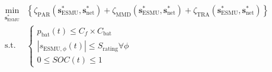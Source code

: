 \begin{equation}
\begin{split}
	\min_{\textbf{s}^*_\text{ESMU}} & \left\{\zeta_\text{PAR}(\textbf{s}^*_\text{ESMU}, \textbf{s}^*_\text{net}) + \zeta_\text{MMD}(\textbf{s}^*_\text{ESMU}, \textbf{s}^*_\text{net}) + \zeta_\text{TRA}(\textbf{s}^*_\text{ESMU}, \textbf{s}^*_\text{net})\right\}\\
	\text{s.t. }& \begin{cases}
		p_\text{bat}(t) \leq C_f\times C_\text{bat}\\
		\left|s_{\text{ESMU},\phi}(t)\right| \leq S_\text{rating} \forall \phi\\
		0 \leq SOC(t) \leq 1
	\end{cases}
\end{split}
\label{ch1:equ:scheduling-cost}
\end{equation}